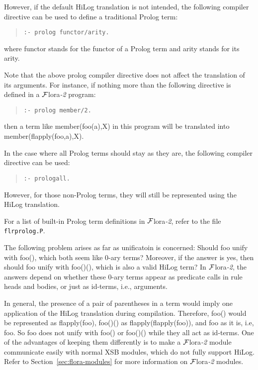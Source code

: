 \documentclass[11pt]{article}
\newcommand{\FLORA}{{\mbox{${\cal F}${\sc lora}\rm\emph{-2}}}\xspace}
\begin{document}
%
However, if the default HiLog translation is not intended, the following
compiler directive can be used to define a traditional Prolog term:
\begin{quote}
\verb|:- prolog functor/arity.|
\end{quote}
where {\sf functor} stands for the functor of a Prolog term and
{\sf arity} stands for its arity.

Note that the above {\sf prolog} compiler directive does not affect
the translation of its arguments. For instance, if nothing more than
the following directive is defined in a \FLORA program:
\begin{quote}
\verb|:- prolog member/2.|
\end{quote}
then a term like {\sf member(foo(a),X)} in this program will be translated
into {\sf member(flapply(foo,a),X)}.

%
In the case where all Prolog terms should stay as they are, the following
compiler directive can be used:
\begin{quote}
\verb|:- prologall.|
\end{quote}
However, for those non-Prolog terms, they will still be represented using
the HiLog translation.

For a list of built-in Prolog term definitions in \FLORA, refer to the
file {\tt flrprolog.P}.

%
The following problem arises as far as unificatoin is concerned:
Should {\sf foo} unify with {\sf foo()}, which both seem like 0-ary
terms? Moreover, if the answer is yes, then should {\sf foo} unify
with {\sf foo()()}, which is also a valid HiLog term?  In \FLORA, the
answers depend on whether these 0-ary terms appear as predicate calls
in rule heads and bodies, or just as id-terms, i.e., arguments.

In general, the presence of a pair of parentheses in a term would imply
one application of the HiLog translation during
compilation. Therefore, {\sf foo()} would be represented as
{\sf flapply(foo)}, {\sf foo()()} as {\sf flapply(flapply(foo))},
and {\sf foo} as it is, i.e, {\sf foo}.  So {\sf foo} does not unify
with {\sf foo()} or {\sf foo()()} while they all act as id-terms. One
of the advantages of keeping them differently is to make a \FLORA module
communicate easily with normal XSB modules, which do not fully support
HiLog. Refer to Section~\ref{sec:flora-modules} for more information
on \FLORA modules.
\end{document}
